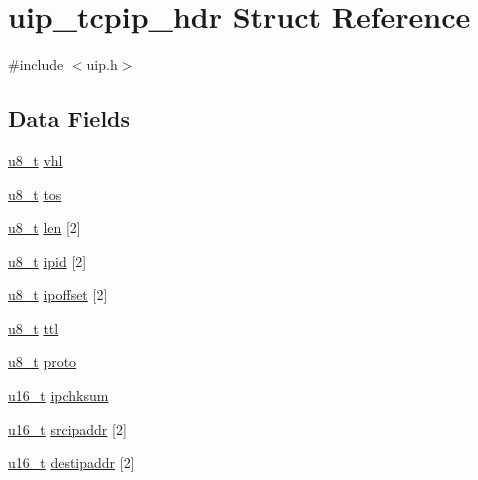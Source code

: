 \hypertarget{structuip__tcpip__hdr}{
\section{uip\_\-tcpip\_\-hdr Struct Reference}
\label{structuip__tcpip__hdr}
}


{\ttfamily \#include $<$uip.h$>$}

\subsection*{Data Fields}
\begin{DoxyCompactItemize}
\item 
\hyperlink{group__uipfw_ga4caecabca98b43919dd11be1c0d4cd8e}{u8\_\-t} \hyperlink{structuip__tcpip__hdr_ae1e60d56ea87dfa09230e25ca5ecf2fc}{vhl}
\item 
\hyperlink{group__uipfw_ga4caecabca98b43919dd11be1c0d4cd8e}{u8\_\-t} \hyperlink{structuip__tcpip__hdr_a8cf0ca17b115ff2e3071b3fabcc43b53}{tos}
\item 
\hyperlink{group__uipfw_ga4caecabca98b43919dd11be1c0d4cd8e}{u8\_\-t} \hyperlink{structuip__tcpip__hdr_ae57281f5bef284bc9545834ef8ed4a96}{len} \mbox{[}2\mbox{]}
\item 
\hyperlink{group__uipfw_ga4caecabca98b43919dd11be1c0d4cd8e}{u8\_\-t} \hyperlink{structuip__tcpip__hdr_a7a59f0dad059786238d8ab604630e7f3}{ipid} \mbox{[}2\mbox{]}
\item 
\hyperlink{group__uipfw_ga4caecabca98b43919dd11be1c0d4cd8e}{u8\_\-t} \hyperlink{structuip__tcpip__hdr_a85d7f35662f7be20cd84e789a290dd4b}{ipoffset} \mbox{[}2\mbox{]}
\item 
\hyperlink{group__uipfw_ga4caecabca98b43919dd11be1c0d4cd8e}{u8\_\-t} \hyperlink{structuip__tcpip__hdr_a0f27e16ddcf7199d514968204966f559}{ttl}
\item 
\hyperlink{group__uipfw_ga4caecabca98b43919dd11be1c0d4cd8e}{u8\_\-t} \hyperlink{structuip__tcpip__hdr_ae45b31a0a277dd5325ad2a332358b21b}{proto}
\item 
\hyperlink{group__uipfw_ga77570ac4fcab86864fa1916e55676da2}{u16\_\-t} \hyperlink{structuip__tcpip__hdr_aaf7a8a5310ad945de38f5b3ac755ae7d}{ipchksum}
\item 
\hyperlink{group__uipfw_ga77570ac4fcab86864fa1916e55676da2}{u16\_\-t} \hyperlink{structuip__tcpip__hdr_ac8f124419a231f38bb6cdf5041757a27}{srcipaddr} \mbox{[}2\mbox{]}
\item 
\hyperlink{group__uipfw_ga77570ac4fcab86864fa1916e55676da2}{u16\_\-t} \hyperlink{structuip__tcpip__hdr_a8d4e08d051b35b1c710c3be5b8bbfa05}{destipaddr} \mbox{[}2\mbox{]}

\end{DoxyCompactItemize}
